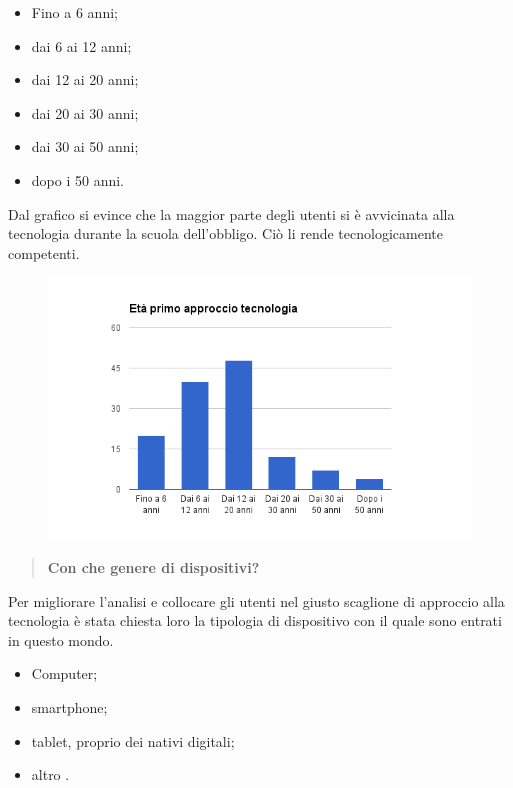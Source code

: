 \begin{itemize}
	\item Fino a 6 anni;
	\item dai 6 ai 12 anni;
	\item dai 12 ai 20 anni;
	\item dai 20 ai 30 anni;
	\item dai 30 ai 50 anni;
	\item dopo i 50 anni.
\end{itemize}

Dal grafico si evince che la maggior parte degli utenti si è avvicinata alla
tecnologia durante la scuola dell'obbligo.  Ciò li rende tecnologicamente
competenti.
\begin{figure}[H]
	\centering
	\includegraphics[scale=0.6]{img/chart_eta_primo_approccio}
\end{figure}

\begin{quote}
	\textbf{Con che genere di dispositivi?}
\end{quote}

Per migliorare l'analisi e collocare gli utenti nel giusto scaglione di
approccio alla tecnologia è stata chiesta loro la tipologia di dispositivo con
il quale sono entrati in questo mondo.

\begin{itemize}
	\item Computer;
	\item smartphone;
	\item tablet, proprio dei nativi digitali;
	\item altro .
\end{itemize}

